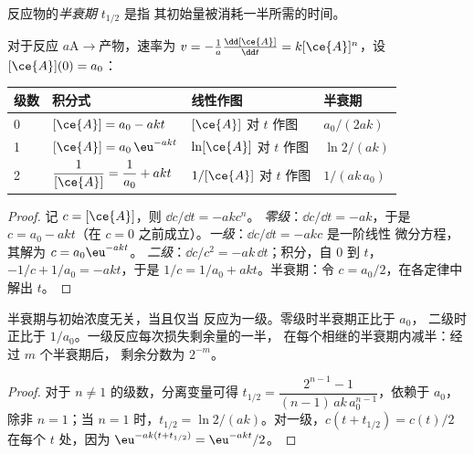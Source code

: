 \begin{definition}[半衰期]\label{def:b1:rate-laws:half-life}
反应物的\emph{半衰期} $t_{1/2}$ 是指
其初始量被消耗一半所需的时间。
\end{definition}

\begin{theorem}[积分速率方程]\label{thm:b1:rate-laws:integrated}
对于反应 $a\mathrm{A} \rightarrow \text{产物}$，速率为 $v = -\frac1a\frac{\dd[\ce{A}]}
{\dd t} = k[\ce{A}]^n$，设 $[\ce{A}](0) = a_0$：
\begin{center}
\begin{tabular}{llll}
\hline
级数 & 积分式 & 线性作图 & 半衰期 \\
\hline
0 & $[\ce{A}] = a_0 - akt$ & $[\ce{A}]$ 对 $t$ 作图 & $a_0/(2ak)$ \\
1 & $[\ce{A}] = a_0\,\eu^{-akt}$ & $\ln[\ce{A}]$ 对 $t$ 作图 & $\ln2/(ak)$ \\
2 & $\dfrac{1}{[\ce{A}]} = \dfrac{1}{a_0} + akt$ & $1/[\ce{A}]$ 对 $t$ 作图 & $1/(ak\,a_0)$ \\
\hline
\end{tabular}
\end{center}
\end{theorem}

\begin{proof}
记 $c = [\ce{A}]$，则 $\dd c/\dd t = -akc^n$。
\emph{零级}：$\dd c/\dd t = -ak$，于是 $c = a_0 - akt$（在
$c = 0$ 之前成立）。\emph{一级}：$\dd c/\dd t = -akc$ 是一阶线性
微分方程，其解为 $c = a_0\eu^{-akt}$。
\emph{二级}：$\dd c/c^2 = -ak\,\dd t$；积分，自 0 到 $t$，
$-1/c + 1/a_0 = -akt$，于是 $1/c = 1/a_0 + akt$。半衰期：令 $c =
a_0/2$，在各定律中解出 $t$。
\end{proof}

\begin{proposition}[半衰期检验]\label{prop:b1:rate-laws:half-life-test}
半衰期与初始浓度无关，当且仅当
反应为一级。零级时半衰期正比于 $a_0$，
二级时正比于 $1/a_0$。一级反应每次损失剩余量的一半，
在每个相继的半衰期内减半：经过 $m$ 个半衰期后，
剩余分数为 $2^{-m}$。
\end{proposition}

\begin{proof}
对于 $n \ne 1$ 的级数，分离变量可得 $t_{1/2} = \dfrac{2^{n-1} -
1}{(n-1)\,ak\,a_0^{n-1}}$，依赖于 $a_0$，除非 $n = 1$；当
$n = 1$ 时，$t_{1/2} = \ln2/(ak)$。对一级，$c(t + t_{1/2}) = c(t)/2$
在每个 $t$ 处，因为 $\eu^{-ak(t + t_{1/2})} = \eu^{-akt}/2$。
\end{proof}

